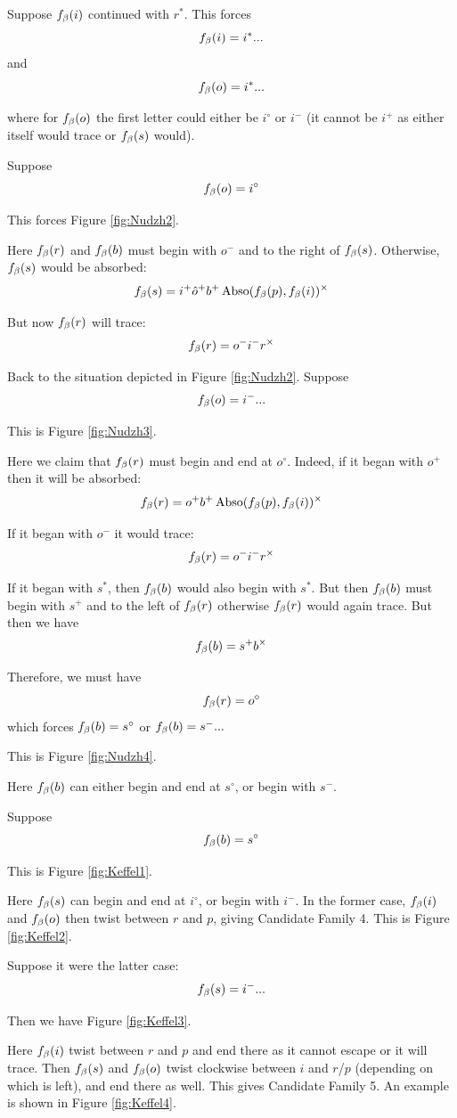 \label{Nudzh}
Suppose $f_\beta(i)$ continued with $r^*$. This forces
$$f_\beta(i) = i^*...$$
and
$$f_\beta(o) = i^*...$$

where for $f_\beta(o)$ the first letter could either be $i^\circ$ or $i^-$ (it cannot be $i^+$ as either itself would trace or $f_\beta(s)$ would).

Suppose 
$$f_\beta(o) = i^\circ$$

This forces Figure \ref{fig:Nudzh2}. 

Here $f_\beta(r)$ and $f_\beta(b)$ must begin with $o^-$ and to the right of $f_\beta(s)$. Otherwise, $f_\beta(s)$ would be absorbed:
$$f_\beta(s) = i^+ \hat{o}^+ b^+ \operatorname{Abso}(f_\beta(p), f_\beta(i))^\times$$

But now $f_\beta(r)$ will trace:
$$f_\beta(r) = o^- i^- r^\times$$

Back to the situation depicted in Figure \ref{fig:Nudzh2}. Suppose
$$f_\beta(o) = i^-...$$

This is Figure \ref{fig:Nudzh3}. 

Here we claim that $f_\beta(r)$ must begin and end at $o^\circ$. Indeed, if it began with $o^+$ then it will be absorbed:
$$f_\beta(r) = o^+ b^+ \operatorname{Abso}(f_\beta(p), f_\beta(i))^\times$$

If it began with $o^-$ it would trace:
$$f_\beta(r) = o^- i^- r^\times$$

If it began with $s^*$, then $f_\beta(b)$ would also begin with $s^*$. But then $f_\beta(b)$ must begin with $s^+$ and to the left of $f_\beta(r)$ otherwise $f_\beta(r)$ would again trace. But then we have
$$f_\beta(b) = s^+ b^\times$$

Therefore, we must have
$$f_\beta(r) = o^\circ$$
which forces $f_\beta(b) = s^\circ$ or $f_\beta(b) = s^-...$

This is Figure \ref{fig:Nudzh4}.

Here $f_\beta(b)$ can either begin and end at $s^\circ$, or begin with $s^-$.

\label{Keffel}
Suppose
$$f_\beta(b) = s^\circ$$

This is Figure \ref{fig:Keffel1}.

Here $f_\beta(s)$ can begin and end at $i^\circ$, or begin with $i^-$. In the former case, $f_\beta(i)$ and $f_\beta(o)$ then twist between $r$ and $p$, giving Candidate Family 4. This is Figure \ref{fig:Keffel2}.

Suppose it were the latter case:
$$f_\beta(s) = i^-...$$

Then we have Figure \ref{fig:Keffel3}.

Here $f_\beta(i)$ twist between $r$ and $p$ and end there as it cannot escape or it will trace. Then $f_\beta(s)$ and $f_\beta(o)$ twist clockwise between $i$ and $r$/$p$ (depending on which is left), and end there as well. This gives Candidate Family 5. An example is shown in Figure \ref{fig:Keffel4}.


